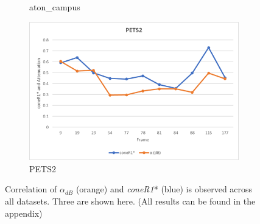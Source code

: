 \begin{figure}
\begin{subfigure}{.49\linewidth}
  \caption{aton\_campus}
\end{subfigure}
\begin{subfigure}{.49\linewidth}
  \includegraphics[width=1\linewidth]{figures/pets2_db_corr.jpg}
  \caption{PETS2}
\end{subfigure}

\caption{Correlation of $\alpha_{dB}$ (orange) and \textit{coneR1}* (blue) is observed across all datasets. Three are shown here. (All results can be found in the appendix)}
\label{fig:corr_db}
\end{figure}

